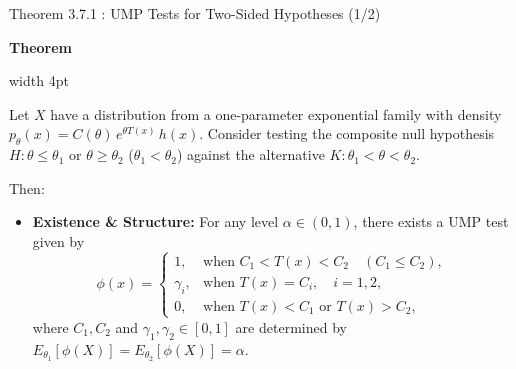\documentclass[10pt, aspectratio=169, xcolor=dvipsnames]{beamer}
\newcommand{\lead}[1]{{\color{UniBlue}\bfseries #1}}
\begin{document}
\begin{frame}{Theorem 3.7.1 : UMP Tests for Two-Sided Hypotheses (1/2)}
    
    \lead{Theorem}\\
    \vspace{0.2cm}
    
    \noindent
    {\color{Teal}\vrule width 4pt}%
    \hspace{10pt}%
    \begin{minipage}{\dimexpr\textwidth-14pt\relax}
        \color{Slate}
        Let $X$ have a distribution from a one-parameter exponential family with density $p_\theta(x) = C(\theta)\, e^{\theta T(x)}\, h(x)$. Consider testing the composite null hypothesis $H : \theta \le \theta_1 \text{ or } \theta \ge \theta_2$ ($\theta_1 < \theta_2$) against the alternative $K : \theta_1 < \theta < \theta_2$.
        
        \vspace{0.15cm}
        Then:
        \vspace{0.15cm}
        \begin{itemize}
            \item[{\tikz[baseline=(char.base)]{\node[shape=circle,draw=Teal,inner sep=1pt,text=Teal,font=\scriptsize\bfseries] (char) {i};}}] \lead{Existence \& Structure:} For any level $\alpha \in (0,1)$, there exists a UMP test given by
            \[
                \phi(x) = \begin{cases}
                    1, & \text{when } C_1 < T(x) < C_2 \quad (C_1 \le C_2), \\
                    \gamma_i, & \text{when } T(x) = C_i, \quad i = 1, 2, \\
                    0, & \text{when } T(x) < C_1 \text{ or } T(x) > C_2,
                \end{cases}
            \]
            where $C_1, C_2$ and $\gamma_1, \gamma_2 \in [0,1]$ are determined by $E_{\theta_1}[\phi(X)] = E_{\theta_2}[\phi(X)] = \alpha$.
        \end{itemize}
    \end{minipage}
\end{frame}
\end{document}
